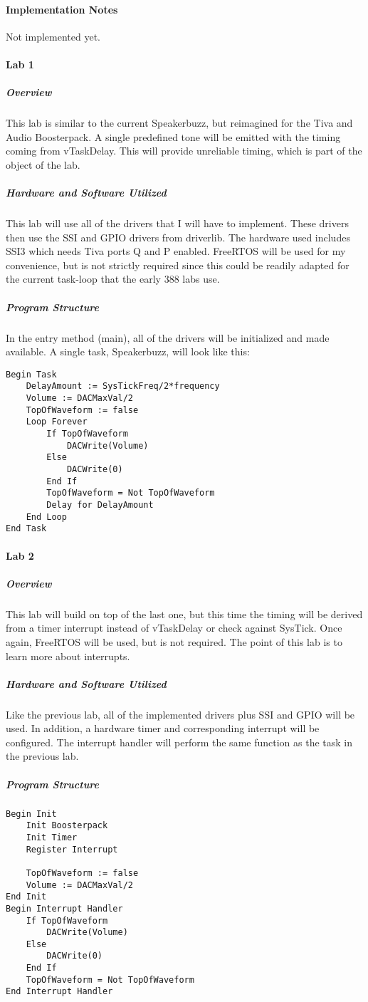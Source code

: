 \documentclass{article}
\begin{document}
\paragraph{Implementation Notes}

Not implemented yet.

\paragraph{Lab 1}
\subparagraph{Overview}
This lab is similar to the current Speakerbuzz, but reimagined for the Tiva and Audio Boosterpack. A single predefined tone will 
be emitted with the timing coming from vTaskDelay. This will provide unreliable timing, which is part of the object of the lab.

\subparagraph{Hardware and Software Utilized}
This lab will use all of the drivers that I will have to implement. These drivers then use the SSI and GPIO drivers from driverlib. 
The hardware used includes SSI3 which needs Tiva ports Q and P enabled. FreeRTOS will be used for my convenience, but is not 
strictly required since this could be readily adapted for the current task-loop that the early 388 labs use.

\subparagraph{Program Structure}
In the entry method (main), all of the drivers will be initialized and made available. A single task, Speakerbuzz, will look like 
this: \\
\begin{verbatim}
Begin Task
    DelayAmount := SysTickFreq/2*frequency
    Volume := DACMaxVal/2
    TopOfWaveform := false
    Loop Forever
        If TopOfWaveform
            DACWrite(Volume)
        Else
            DACWrite(0)
        End If
        TopOfWaveform = Not TopOfWaveform
        Delay for DelayAmount
    End Loop
End Task
\end{verbatim}
\paragraph{Lab 2}
\subparagraph{Overview}
This lab will build on top of the last one, but this time the timing will be derived from a timer interrupt instead of vTaskDelay 
or check against SysTick. Once again, FreeRTOS will be used, but is not required. The point of this lab is to learn more about 
interrupts.
\subparagraph{Hardware and Software Utilized}
Like the previous lab, all of the implemented drivers plus SSI and GPIO will be used. In addition, a hardware timer and 
corresponding interrupt will be configured. The interrupt handler will perform the same function as the task in the previous lab.
\subparagraph{Program Structure}
\begin{verbatim}
Begin Init
    Init Boosterpack
    Init Timer
    Register Interrupt

    TopOfWaveform := false
    Volume := DACMaxVal/2
End Init
Begin Interrupt Handler
    If TopOfWaveform
        DACWrite(Volume)
    Else
        DACWrite(0)
    End If
    TopOfWaveform = Not TopOfWaveform
End Interrupt Handler
\end{verbatim}
\end{document}
